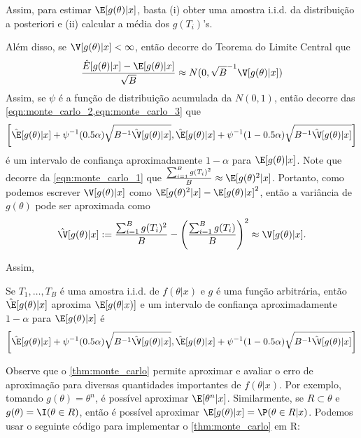 Assim, para estimar $\E[g(\theta)|x]$, basta
(i) obter uma amostra i.i.d. da distribuição a posteriori e
(ii) calcular a média dos $g(T_{i})$'s. 


Além disso, se $\V[g(\theta)|x] < \infty$, então
decorre do Teorema do Limite Central que
\begin{align}
 \label{eqn:monte_carlo_3}
 \frac{\hat{E}[g(\theta)|x]-\E[g(\theta)|x]}{\sqrt{B}}
 \approx N(0,\sqrt{B}^{-1}\V[g(\theta)|x])
\end{align}
Assim, se $\psi$ é a função de distribuição acumulada da
$N(0,1)$, então decorre das
\cref{eqn:monte_carlo_2,eqn:monte_carlo_3} que
\begin{align}
 \label{eqn:monte_carlo_4}
 \left[\hat{\E}[g(\theta)|x]
 +\psi^{-1}(0.5\alpha)\sqrt{B^{-1}\hat{\V}[g(\theta)|x]},
 \hat{\E}[g(\theta)|x]
 +\psi^{-1}(1-0.5\alpha)
 \sqrt{B^{-1}\hat{\V}[g(\theta)|x]}\right]
\end{align}
é um intervalo de confiança aproximadamente
$1-\alpha$ para $\E[g(\theta)|x]$.
Note que decorre da
\cref{eqn:monte_carlo_1} que
$\frac{\sum_{i=1}^{B}{g(T_{i})^{2}}}{B} \approx \E[g(\theta)^{2}|x]$.
Portanto, como podemos escrever
$\V[g(\theta)|x]$ como
$\E[g(\theta)^{2}|x]-\E[g(\theta)|x]^{2}$, então a variância de 
$g(\theta)$ pode ser aproximada como
\begin{align}
 \label{eqn:monte_carlo_2}
 \hat{\V}[g(\theta)|x]
 := \frac{\sum_{i=1}^{B}{g(T_{i})^{2}}}{B}
 -\left(\frac{\sum_{i=1}^{B}{g(T_{i})}}{B}\right)^{2}
 \approx \V[g(\theta)|x].
\end{align}


Assim,
\begin{theorem}
 \label{thm:monte_carlo}
 Se $T_{1},\ldots,T_{B}$ é uma amostra i.i.d. de 
 $f(\theta|x)$ e $g$ é uma função arbitrária, então
 $\hat{\E}[g(\theta)|x]$ aproxima $\E[g(\theta|x)]$ e 
 um intervalo de confiança aproximadamente $1-\alpha$ para
 $\E[g(\theta)|x]$ é
 \begin{align*}
  \left[\hat{\E}[g(\theta)|x]
  +\psi^{-1}(0.5\alpha)\sqrt{B^{-1}\hat{\V}[g(\theta)|x]},
  \hat{\E}[g(\theta)|x]+\psi^{-1}(1-0.5\alpha)
  \sqrt{B^{-1}\hat{\V}[g(\theta)|x]}\right]
 \end{align*}
\end{theorem}

Observe que o \cref{thm:monte_carlo} permite aproximar
e avaliar o erro de aproximação para
diversas quantidades importantes de $f(\theta|x)$.
Por exemplo, tomando $g(\theta) = \theta^{n}$,
é possível aproximar $\E[\theta^{n}|x]$.
Similarmente, se $R \subset \theta$ e
$g(\theta) = \I(\theta \in R)$,
então é possível aproximar 
$\E[g(\theta)|x] = \P(\theta \in R|x)$.
Podemos usar o seguinte código para implementar o \cref{thm:monte_carlo} em R:

